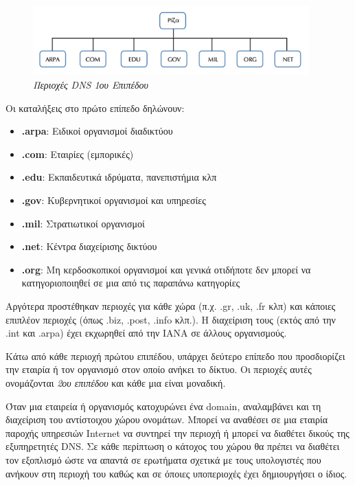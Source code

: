 \begin{figure}[!ht]
  \centering
  \includegraphics[width=0.95\textwidth]{images/chapter6/6-1}
  \caption {\textsl{Περιοχές DNS 1ου Επιπέδου}}
  \label{6-1}
\end{figure}

Οι καταλήξεις στο πρώτο επίπεδο δηλώνουν:

\begin{itemize}
\item \textbf{.arpa}: Ειδικοί οργανισμοί διαδικτύου
\item \textbf{.com}: Εταιρίες (εμπορικές)
\item \textbf{.edu}: Εκπαιδευτικά ιδρύματα, πανεπιστήμια κλπ
\item \textbf{.gov}: Κυβερνητικοί οργανισμοί και υπηρεσίες
\item \textbf{.mil}: Στρατιωτικοί οργανισμοί
\item \textbf{.net}: Κέντρα διαχείρισης δικτύου
\item \textbf{.org}: Μη κερδοσκοπικοί οργανισμοί και γενικά οτιδήποτε δεν μπορεί να κατηγοριοποιηθεί σε μια από τις παραπάνω κατηγορίες
\end{itemize}

Αργότερα προστέθηκαν περιοχές για κάθε χώρα (π.χ. .gr, .uk, .fr κλπ) και κάποιες επιπλέον περιοχές (όπως .biz, .post, .info κλπ.). Η διαχείριση τους (εκτός από την .int και .arpa) έχει εκχωρηθεί από την IANA σε άλλους οργανισμούς.

Κάτω από κάθε περιοχή πρώτου επιπέδου, υπάρχει δεύτερο επίπεδο που προσδιορίζει την εταιρία ή τον οργανισμό στον οποίο ανήκει το δίκτυο. Οι περιοχές αυτές ονομάζονται \emph{2ου επιπέδου} και κάθε μια είναι μοναδική. 

Όταν μια εταιρεία ή οργανισμός κατοχυρώνει ένα domain, αναλαμβάνει και τη διαχείριση του αντίστοιχου χώρου ονομάτων. Μπορεί να αναθέσει σε μια εταιρία παροχής υπηρεσιών Internet να συντηρεί την περιοχή ή μπορεί να διαθέτει δικούς της εξυπηρετητές DNS. Σε κάθε περίπτωση ο κάτοχος του χώρου θα πρέπει να διαθέτει τον εξοπλισμό ώστε να απαντά σε ερωτήματα σχετικά με τους υπολογιστές που ανήκουν στη περιοχή του καθώς και σε όποιες υποπεριοχές έχει δημιουργήσει ο ίδιος.

